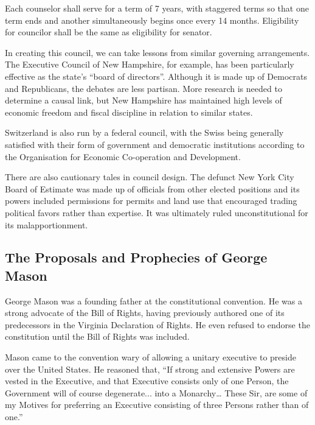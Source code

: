 \documentclass{article}
\newcommand{\quotes}[1]{``#1''}
\begin{document}
\begin{quoting}
Each counselor shall serve for a term of 7 years, with staggered terms so that one term ends and another simultaneously begins once every 14 months. Eligibility for councilor shall be the same as eligibility for senator.
\end{quoting}

In creating this council, we can take lessons from similar governing arrangements\cite{Khanna}. The Executive Council of New Hampshire, for example, has been particularly effective as the state's \quotes{board of directors}\cite{Hahn-Burkett}. Although it is made up of Democrats and Republicans, the debates are less partisan\cite{Timmins}. More research is needed to determine a causal link, but New Hampshire has maintained high levels of economic freedom and fiscal discipline in relation to similar states\cite{Ruger}.

Switzerland is also run by a federal council, with the Swiss being generally satisfied with their form of government and democratic institutions according to the Organisation for Economic Co-operation and Development\cite{Kaufman}.

There are also cautionary tales in council design. The defunct New York City Board of Estimate was made up of officials from other elected positions and its powers included permissions for permits and land use that encouraged trading political favors rather than expertise\cite{Purnick}. It was ultimately ruled unconstitutional for its malapportionment\cite{Board_of_Estimate}.

\subsection{The Proposals and Prophecies of George Mason}

George Mason was a founding father at the constitutional convention. He was a strong advocate of the Bill of Rights, having previously authored one of its predecessors in the Virginia Declaration of Rights. He even refused to endorse the constitution until the Bill of Rights was included.

Mason came to the convention wary of allowing a unitary executive to preside over the United States. He reasoned that, \quotes{If strong and extensive Powers are vested in the Executive, and that Executive consists only of one Person, the Government will of course degenerate... into a Monarchy… These Sir, are some of my Motives for preferring an Executive consisting of three Persons rather than of one.}\cite{Mason}
\end{document}
